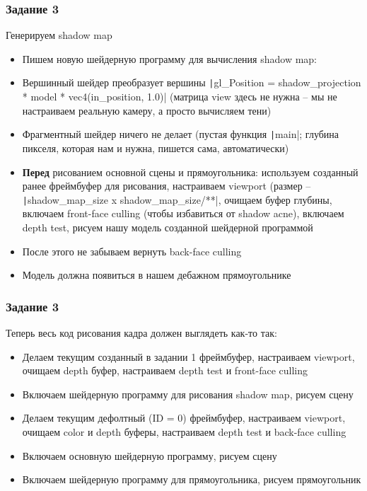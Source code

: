 \documentclass[10pt]{beamer}
\begin{document}
\begin{frame}[fragile]
\frametitle{Задание 3}
\begin{footnotesize}
Генерируем shadow map
\begin{itemize}
\item Пишем новую шейдерную программу для вычисления shadow map:
\item Вершинный шейдер преобразует вершины \texttt|gl_Position = shadow_projection * model * vec4(in_position, 1.0)| (матрица view здесь не нужна -- мы не настраиваем реальную камеру, а просто вычисляем тени)
\item Фрагментный шейдер ничего не делает (пустая функция \texttt|main|; глубина пикселя, которая нам и нужна, пишется сама, автоматически)
\item \textbf{Перед} рисованием основной сцены и прямоугольника: используем созданный ранее фреймбуфер для рисования, настраиваем viewport (размер -- \texttt|shadow_map_size x shadow_map_size/**|, очищаем буфер глубины, включаем front-face culling (чтобы избавиться от shadow acne), включаем depth test, рисуем нашу модель созданной шейдерной программой
\item После этого не забываем вернуть back-face culling
\item Модель должна появиться в нашем дебажном прямоугольнике
\end{itemize}
\end{footnotesize}
\end{frame}

\begin{frame}[fragile]
\frametitle{Задание 3}
Теперь весь код рисования кадра должен выглядеть как-то так:
\begin{itemize}
\item Делаем текущим созданный в задании 1 фреймбуфер, настраиваем viewport, очищаем depth буфер, настраиваем depth test и front-face culling
\item Включаем шейдерную программу для рисования shadow map, рисуем сцену
\item Делаем текущим дефолтный (ID = 0) фреймбуфер, настраиваем viewport, очищаем color и depth буферы, настраиваем depth test и back-face culling
\item Включаем основную шейдерную программу, рисуем сцену
\item Включаем шейдерную программу для прямоугольника, рисуем прямоугольник
\end{itemize}
\end{frame}
\end{document}
